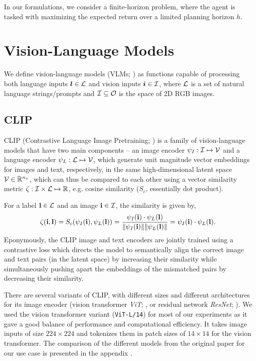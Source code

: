 In our formulations, we consider a finite-horizon problem, where the agent is tasked with maximizing the expected return over a limited planning horizon \(h\).

\newpage
\section{Vision-Language Models}
\label{sec:vlms}

We define vision-language models (VLMs; \cite{vlmsurvey}) as functions capable of processing both language inputs \(\bm{l} \in \mathcal{L}\) and vision inputs \(\bm{i} \in \mathcal{I}\), where \(\mathcal{L}\) is a set of natural language strings/prompts and \(\mathcal{I} \subseteq \mathcal{O}\) is the space of 2D RGB images.

\subsection{CLIP}
\label{sec:clip}
CLIP (Contrastive Language Image Pretraining; \cite{clip}) is a family of vision-language models that have two main components -- an image encoder \(\psi_I: \mathcal{I} \mapsto \mathcal{V}\) and a language encoder \(\psi_L: \mathcal{L} \mapsto \mathcal{V}\), which generate unit magnitude vector embeddings for images and text, respectively, in the same high-dimensional latent space \(\mathcal{V} \in \mathbb{R}^{n_v}\), which can thus be compared to each other using a vector similarity metric \(\zeta: \mathcal{I} \times \mathcal{L} \mapsto \mathbb{R}\), e.g. cosine similarity (\(S_c\), essentially dot product).

For a label \(\mathbf{l} \in \mathcal{L}\) and an image \(\mathbf{i} \in \mathcal{I}\), the similarity is given by,
\begin{equation}
    \label{eq:clip-similarity}
    \zeta(\mathbf{i}, \mathbf{l}) = S_c(\psi_I(\mathbf{i}), \psi_L(\mathbf{l})) = \dfrac{\psi_I(\mathbf{i}) \cdot \psi_L(\mathbf{l})}{\| \psi_I(\mathbf{i}) \| \| \psi_L(\mathbf{l}) \|} = \psi_I(\mathbf{i}) \cdot \psi_L(\mathbf{l}).
\end{equation}
Eponymously, the CLIP image and text encoders are jointly trained using a contrastive loss which directs the model to semantically align the correct image and text pairs (in the latent space) by increasing their similarity while simultaneously pushing apart the embeddings of the mismatched pairs by decreasing their similarity.

There are several variants of CLIP, with different sizes and different architectures for its image encoder (vision transformer \emph{ViT}; \cite{vit}, or residual network \emph{ResNet}; \cite{resnet}).
We used the vision transformer variant (\texttt{ViT-L/14}) for most of our experiments as it gave a good balance of performance and computational efficiency.
It takes image inputs of size \(224 \times 224\) and tokenizes them in patch sizes of \(14 \times 14\) for the vision transformer.
The comparison of the different models from the original paper for our use case is presented in the appendix .

